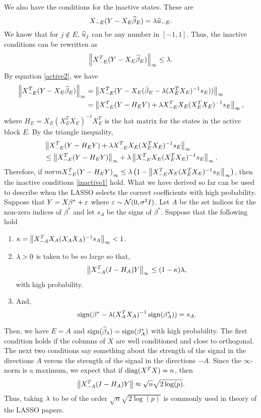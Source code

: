  We also have the conditions for the inactive states. These are
\[X_{- E}(Y-X_E\widehat{\beta}_E) = \lambda \widehat{u}_{-E}. \]
We know that for $j \notin E$, $\widehat{u}_j$ can be any number in $[-1,1]$. Thus, the inactive conditions can be rewritten as
\begin{equation}
    \label{inactive1} \left\|X_{-E}^T(Y-X_E\widehat{\beta}_E)\right\|_\infty \le \lambda.
\end{equation}
By equation \eqref{active2}, we have
\begin{align*}
    \left\|X_{-E}^T(Y-X_E\widehat{\beta}_E)\right\|_\infty &=\left\|X_{-E}^T(Y- X_E(\bar{\beta}_E-\lambda (X_E^TX_E)^{-1}s_E))\right\|_\infty \\
    &=\left\|X_{-E}^T(Y-H_EY) + \lambda X_{-E}^TX_E(X_E^TX_E)^{-1}s_E\right\|_{\infty},
\end{align*}
where $H_E = X_E(X_E^TX_E)^{-1}X_E^T$ is the hat matrix for the states in the active block $E$. By the triangle inequality,
\begin{align*}
    &\left\|X_{-E}^T(Y-H_EY) + \lambda X_{-E}^TX_E(X_E^TX_E)^{-1}s_E\right\|_{\infty}\\
    &\le \left\|X_{-E}^T(Y-H_EY)\right\|_\infty + \lambda \left\|X_{-E}^TX_E(X_E^TX_E)^{-1}s_E\right\|_\infty.
\end{align*}
Therefore, if $norm{X_{-E}^T(Y-H_EY)}_\infty  \le \lambda\left(1- \left\|X_{-E}^TX_E(X_E^TX_E)^{-1}s_E\right\|_\infty\right)$, then the inactive conditions \eqref{inactive1} hold. What we have derived so far can be used to describe when the LASSO selects the correct coefficients with high probability. Suppose that $Y = X\beta^* + \varepsilon$ where $\varepsilon \sim {{\mathcal{N}}}(0,\sigma^2I)$. Let $A$ be the set indices for the non-zero indices of $\beta^*$ and let $s_A$ be the signs of $\beta^*$. Suppose that the following hold 
\begin{enumerate}
    \item $\kappa = \left\|X_{-A}^TX_A(X_{A}X_{A})^{-1}s_A\right\|_\infty < 1$.
    \item $\lambda >0$ is taken to be  so large so that,
    \[ \left\|X_{-A}^T(I-H_A)Y\right\|_\infty \le (1-\kappa)\lambda, \]
    with high probability.
    \item And, 
    \[\operatorname{sign}(\beta^* - \lambda(X_A^TX_A)^{-1}\operatorname{sign}(\beta^*_A)) = s_A. \] 
\end{enumerate}
Then, we have $E=A$ and $\operatorname{sign}(\widehat{\beta}_\lambda)=\operatorname{sign}(\beta^*_A)$ with high probability. The first condition holds if the columns of $X$ are well conditioned and close to orthogonal. The next two conditions say something about the strength of the signal in the directions $A$ versus the strength of the signal in the directions $-A$. Since the $\infty$-norm is a maximum, we expect that if $\operatorname{diag}(X^TX)=n$, then
\[\left\|X^T_{-A}(I-H_A)Y\right\|\approx \sqrt{n}\sqrt{2\log(p)}. \]
Thus, taking $\lambda$ to be of the order $\sqrt{n}\sqrt{2\log(p)}$ is commonly used in theory of the LASSO papers.
